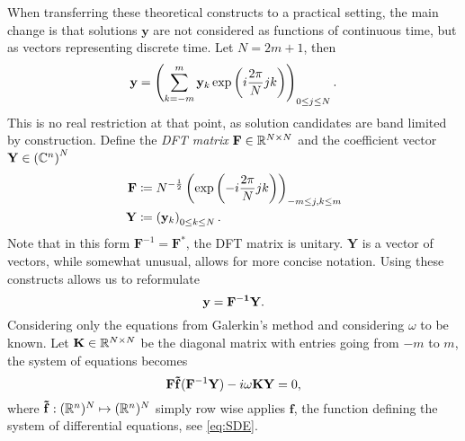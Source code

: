 When transferring these theoretical constructs to a practical setting, the main change is that solutions $\mathbf{y}$ are not considered as functions of continuous time, but as vectors representing discrete time.
Let $N = 2m+1$, then
	\[
		\mathbf{\mathbf{y}} = \left( \sum_{k=-m}^m \mathbf{y}_k \exp\left(i \frac{2\pi}{N} j k\right) \right)_{0 \le j \le N} \text.
	\]
This is no real restriction at that point, as solution candidates are band limited by construction.
Define the \emph{DFT matrix} $\mathbf F \in \mathbb{R}^{N \times N}$ and the coefficient vector $\mathbf Y \in \left(\mathbb{C}^n\right)^N$
	\begin{align*}
		\mathbf{F} &\coloneqq N^{-\frac12} \left( \exp\left(-i \frac{2\pi}{N} j k \right) \right)_{-m \le j,k \le m} \\
		\mathbf{Y} &\coloneqq \left(\mathbf{y}_k\right)_{0 \le k \le N} \text.
	\end{align*}
Note that in this form $\mathbf{F}^{-1} = \mathbf{F}^*$, the DFT matrix is unitary.
$\mathbf Y$ is a vector of vectors, while somewhat unusual, allows for more concise notation.
Using these constructs allows us to reformulate
	\[
			\mathbf{y} = \mathbf{F^{-1}} \mathbf{Y} \text.
	\]
Considering only the equations from Galerkin's method and considering $\omega$ to be known.
Let $\mathbf K \in \mathbb{R}^{N \times N}$ be the diagonal matrix with entries going from $-m$ to $m$, the system of equations becomes
	\[
		\mathbf{F} \mathbf{\tilde f}(\mathbf F^{-1} \mathbf{Y}) - i \omega \mathbf K \mathbf Y = 0\text,
	\]
where $\mathbf{\tilde f}: (\mathbb{R}^n)^N \mapsto (\mathbb{R}^n)^N$ simply row wise applies $\mathbf{f}$, the function defining the system of differential equations, see \autoref{eq:SDE}.

